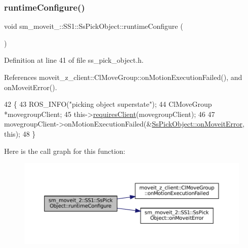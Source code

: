 \subsubsection{\texorpdfstring{runtime\+Configure()}{runtimeConfigure()}}
{\footnotesize\ttfamily void sm\+\_\+moveit\+\_\+::\+S\+S1\+::\+Ss\+Pick\+Object\+::runtime\+Configure (\begin{DoxyParamCaption}{ }\end{DoxyParamCaption})\hspace{0.3cm}{\ttfamily [inline]}}



Definition at line 41 of file ss\+\_\+pick\+\_\+object.\+h.



References moveit\+\_\+z\+\_\+client\+::\+Cl\+Move\+Group\+::on\+Motion\+Execution\+Failed(), and on\+Moveit\+Error().


\begin{DoxyCode}
42     \{
43         ROS\_INFO(\textcolor{stringliteral}{"picking object superstate"});
44         ClMoveGroup *movegroupClient;
45         this->\hyperlink{classsmacc_1_1ISmaccState_a7f95c9f0a6ea2d6f18d1aec0519de4ac}{requiresClient}(movegroupClient);
46 
47         movegroupClient->onMotionExecutionFailed(&\hyperlink{structsm__moveit__2_1_1SS1_1_1SsPickObject_af87168e32fc8acb369f87f2ce438bd29}{SsPickObject::onMoveitError}, \textcolor{keyword}{
      this});
48     \}
\end{DoxyCode}
Here is the call graph for this function\+:
\nopagebreak
\begin{figure}[H]
\begin{center}
\leavevmode
\includegraphics[width=350pt]{structsm__moveit__2_1_1SS1_1_1SsPickObject_a7545dc96063c5a0930d671c973b13f6e_cgraph}
\end{center}
\end{figure}
\mbox{\label{structsm__moveit__2_1_1SS1_1_1SsPickObject_a60e52cff4499c46a88230b0b6411f15b}} 
